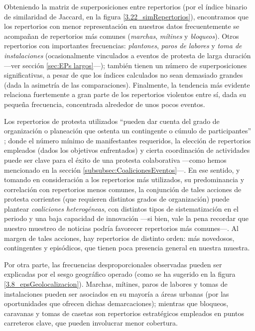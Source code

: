 \documentclass[letterpaper, 11pt]{book}
\theoremstyle{definition}
\theoremstyle{remark}
\begin{document}
Obteniendo la matriz de superposiciones entre repertorios (por el índice binario de similaridad de Jaccard, en la figura \ref{3.22_simRepertorios}), encontramos que los repertorios con menor representación en nuestros datos frecuentemente se acompañan de repertorios más comunes (\emph{marchas}, \emph{mítines} y \emph{bloqueos}). 
Otros repertorios con importantes frecuencias: \emph{plantones}, \emph{paros de labores} y \emph{toma de instalaciones} (ocasionalmente vinculados a eventos de protesta de larga duración ---ver sección \ref{sec:EPs largos}---); también tienen un número de superposiciones significativas, a pesar de que los índices calculados no sean demasiado grandes (dada la asimetría de las comparaciones). 
Finalmente, la tendencia más evidente relaciona fuertemente a gran parte de los repertorios violentos entre sí, dada su pequeña frecuencia, concentrada alrededor de unos pocos eventos. 


Los repertorios de protesta utilizados ``pueden dar cuenta del grado de organización o planeación que ostenta un contingente o cúmulo de participantes'' \citep[27]{2017_Urbina_estudiantes}; donde el número mínimo de manifestantes requeridos, la elección de repertorios empleados (dados los objetivos enfrentados) y cierta coordinación de actividades puede ser clave para el éxito de una protesta colaborativa ---como hemos mencionado en la sección \ref{subsubsec:CoalicionesEventos}---. 
En ese sentido, y tomando en consideración a los repertorios más utilizados, su predominancia y correlación con repertorios menos comunes, la conjunción de tales acciones de protesta corrientes (que requieren distintos grados de organización) puede plantear \emph{coaliciones heterogéneas}, con distintos tipos de sistematización en el periodo y una baja capacidad de innovación ---si bien, vale la pena recordar que nuestro muestreo de noticias podría favorecer repertorios más comunes---. 
Al margen de tales acciones, hay repertorios de distinto orden: más novedosos, contingentes y episódicos, que tienen poca presencia general en nuestra muestra. 

Por otra parte, las frecuencias desproporcionales observadas pueden ser explicadas por el sesgo geográfico operado (como se ha sugerido en la figura \ref{3.8_epsGeolocalizacion}). 
Marchas, mítines, paros de labores y tomas de instalaciones pueden ser asociados en su mayoría a áreas urbanas (por las oportunidades que ofrecen dichas demarcaciones); 
mientras que bloqueos, caravanas y tomas de casetas son repertorios estratégicos empleados en puntos carreteros clave, que pueden involucrar menor cobertura. 
\end{document}

